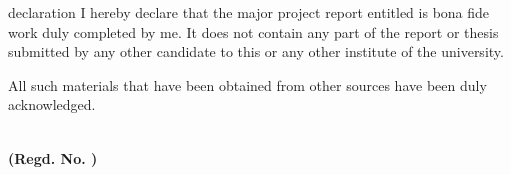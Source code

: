 \begin{letterheadpage}{declaration}
\noindent I hereby declare that the major project report entitled \textbf{\textit{\docTitle}} is bona fide work duly completed by me. It does not contain any part of the report or thesis submitted by any other candidate to this or any other institute of the university.

All such materials that have been obtained from other sources have been duly acknowledged.

\vspace{1cm}
\begin{flushright}
    \textbf{\studentName} \\
    \textbf{(Regd. No. \texttt{\studentRoll})}
\end{flushright}
\end{letterheadpage}
